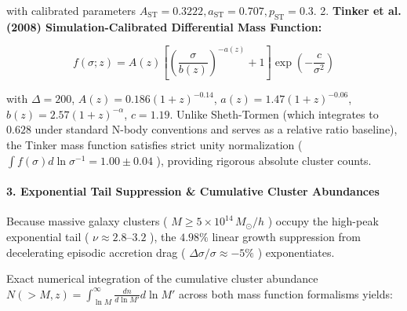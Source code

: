 \documentclass[11pt,a4paper]{article}
\theoremstyle{definition}\newtheorem{definition}{Definition}
\theoremstyle{remark}\newtheorem{remark}{Remark}
\begin{document}
with calibrated parameters $A_{\text{ST}} = 0.3222, a_{\text{ST}} = 0.707, p_{\text{ST}} = 0.3$.
2. \textbf{Tinker et al. (2008) Simulation-Calibrated Differential Mass Function:}


\begin{equation}
f(\sigma; z) = A(z) \left[ \left( \frac{\sigma}{b(z)} \right)^{-a(z)} + 1 \right] \exp\left( -\frac{c}{\sigma^2} \right)
\end{equation}


with $\Delta = 200$, $A(z) = 0.186(1+z)^{-0.14}$, $a(z) = 1.47(1+z)^{-0.06}$, $b(z) = 2.57(1+z)^{-\alpha}$, $c = 1.19$. Unlike Sheth-Tormen (which integrates to $0.628$ under standard N-body conventions and serves as a relative ratio baseline), the Tinker mass function satisfies strict unity normalization ( $\int f(\sigma) d\ln\sigma^{-1} = 1.00 \pm 0.04$ ), providing rigorous absolute cluster counts.
\paragraph{3. Exponential Tail Suppression \& Cumulative Cluster Abundances}

Because massive galaxy clusters ( $M \ge 5 \times 10^{14} \, M_\odot/h$ ) occupy the high-peak exponential tail ( $\nu \approx 2.8\text{--}3.2$ ), the $4.98\%$ linear growth suppression from decelerating episodic accretion drag ( $\Delta\sigma/\sigma \approx -5\%$ ) exponentiates.

Exact numerical integration of the cumulative cluster abundance $N(>M, z) = \int_{\ln M}^\infty \frac{dn}{d\ln M'} d\ln M'$ across both mass function formalisms yields:
\end{document}
